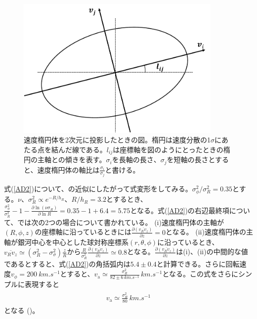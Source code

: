 \begin{figure}[htbp]
\begin{center}
	\includegraphics[width=10cm]{fig/velocity_ellipsoid.pdf}
	\caption{速度楕円体を2次元に投影したときの図。楕円は速度分散の1$\sigma$にあたる点を結んだ線である。$l_{ij}$は座標軸を図のようにとったときの楕円の主軸との傾きを表す。$\sigma_i$を長軸の長さ、$\sigma_j$を短軸の長さとすると、速度楕円体の軸比は$\frac{\sigma_i}{\sigma_j}$と書ける。}
	\label{fig:ve}
\end{center}
\end{figure}

式(\ref{AD2})について、\cite{BT2008}の近似にしたがって式変形をしてみる。$\sigma_{\phi}^2/\sigma_R^2 = 0.35$とする。$\nu、\sigma_R^2 \propto e^{-R/h_R}、R/h_R = 3.2$とするとき、
$\frac{\sigma_{\phi}^2}{\sigma_R^2} - 1 - \frac{\partial \ln{(\nu \sigma_R)}}{\partial \ln{R}} = 0.35 - 1 + 6.4 = 5.75$となる。式(\ref{AD2})の右辺最終項について、\cite{BT2008}では次の2つの場合について書かれている。
(i)速度楕円体の主軸が$(R,\phi,z)$の座標軸に沿っているときには$\frac{\partial(\overline{v_R v_z})}{\partial z} = 0$となる。
(ii)速度楕円体の主軸が銀河中心を中心とした球対称座標系$(r,\theta,\phi)$に沿っているとき、$\overline{v_R v_z} \simeq (\sigma_R^2 - \sigma_{\sigma}^2)\frac{z}{R}$から$\frac{R}{\sigma_R^2} \frac{\partial (\overline{v_R v_z})}{\partial z} \simeq 0.8$となる。$\frac{\partial(\overline{v_R v_z})}{\partial z}$は(i)、(ii)の中間的な値であるとすると、式(\ref{AD2})の角括弧内は$5.4 \pm 0.4$と計算できる。さらに回転速度$v_{\phi} = \SI{200}{km.s^{-1}}$とすると、$v_{\mathrm{a}} \simeq \frac{\sigma_R^2}{82 \pm 6\,\si{km.s^{-1}}}\,\si{km.s^{-1}}$となる。この式をさらにシンプルに表現すると
\begin{align}
\begin{aligned}
    v_{\mathrm{a}} \simeq \frac{\sigma_R^2}{80}\,\si{km.s^{-1}}
\end{aligned} \label{AD3}
\end{align}
となる (\cite{BT2008})。



